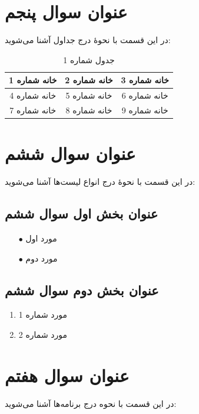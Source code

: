 \documentclass{article}
\begin{document}
\section{عنوان سوال پنجم}
در این قسمت با نحوۀ درج جداول آشنا می‌شوید:
\begin{table}[h!]
    \centering
    \caption{جدول شماره 1}
    \label{tab1}
    \begin{tabular}{|c|c|c|}
    \hline
    خانه شماره 1 & خانه شماره 2 & خانه شماره 3\\
    \hline
    خانه شماره 4 & خانه شماره 5 & خانه شماره 6\\
    \hline
    خانه شماره 7 & خانه شماره 8 & خانه شماره 9\\
    \hline
    \end{tabular}
\end{table}

\section{عنوان سوال ششم}
در این قسمت با نحوۀ درج انواع لیست‌ها آشنا می‌شوید:
\subsection{عنوان بخش اول سوال ششم}
\begin{itemize}
    \item [$\bullet$] مورد اول
    \item [$\bullet$] مورد دوم
\end{itemize}
\subsection{عنوان بخش دوم سوال ششم}
\begin{enumerate}
    \item مورد شماره 1
    \item مورد شماره 2
\end{enumerate}

\section{عنوان سوال هفتم}
در این قسمت با نحوه درج برنامه‌ها آشنا می‌شوید:
\lr{}
\lr{}
\lr{}
\lr{}
\end{document}
